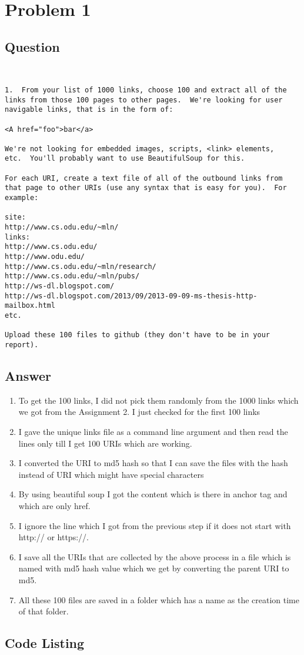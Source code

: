 \section{Problem 1}
\label{part1}
\subsection*{Question}
\begingroup
\begin{verbatim}


1.  From your list of 1000 links, choose 100 and extract all of the
links from those 100 pages to other pages.  We're looking for user 
navigable links, that is in the form of: 

<A href="foo">bar</a>

We're not looking for embedded images, scripts, <link> elements,
etc.  You'll probably want to use BeautifulSoup for this.

For each URI, create a text file of all of the outbound links from
that page to other URIs (use any syntax that is easy for you).  For
example:

site: 
http://www.cs.odu.edu/~mln/    
links:
http://www.cs.odu.edu/
http://www.odu.edu/
http://www.cs.odu.edu/~mln/research/
http://www.cs.odu.edu/~mln/pubs/
http://ws-dl.blogspot.com/
http://ws-dl.blogspot.com/2013/09/2013-09-09-ms-thesis-http-mailbox.html
etc.

Upload these 100 files to github (they don't have to be in your report).

\end{verbatim}
\newpage
\subsection{Answer}

\begin{enumerate}
\item To get the 100 links, I did not pick them randomly from the 1000 links which we got from the Assignment 2. I just checked for the first 100 links 
\item I gave the unique links file as a command line argument and then read the lines only till I get 100 URIs which are working. 
\item I converted the URI to md5 hash so that I can save the files with the hash instead of URI which might have special characters 
\item By using beautiful soup I got the content which is there in anchor tag  and which are only href. 
\item I ignore the line which I got from the previous step if it does not start with http:// or https://.  
\item I save all the URIs that are collected by the above process in a file which is named with md5 hash value which we get by converting the parent URI to md5. 
\item All these 100 files are saved in a folder which has a name as the creation time of that folder. 
\end{enumerate}
\subsection{Code Listing}
